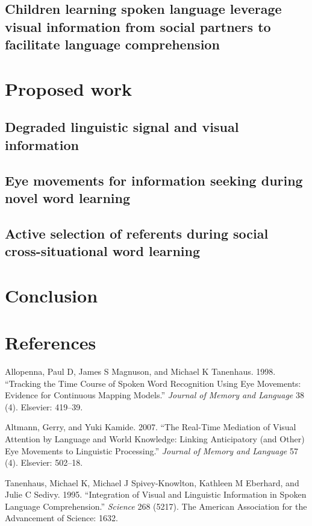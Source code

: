 \documentclass[]{elsarticle} %
\begin{document}
\subsection{Children learning spoken language leverage visual
information from social partners to facilitate language
comprehension}\label{children-learning-spoken-language-leverage-visual-information-from-social-partners-to-facilitate-language-comprehension}

\section{Proposed work}\label{proposed-work}

\subsection{Degraded linguistic signal and visual
information}\label{degraded-linguistic-signal-and-visual-information}

\subsection{Eye movements for information seeking during novel word
learning}\label{eye-movements-for-information-seeking-during-novel-word-learning}

\subsection{Active selection of referents during social
cross-situational word
learning}\label{active-selection-of-referents-during-social-cross-situational-word-learning}

\section{Conclusion}\label{conclusion}

\newpage 

\section{References}\label{references}

\setlength{\parindent}{-0.3in} \setlength{\leftskip}{0.2in} \noindent

\hypertarget{refs}{}
\hypertarget{ref-allopenna1998tracking}{}
Allopenna, Paul D, James S Magnuson, and Michael K Tanenhaus. 1998.
``Tracking the Time Course of Spoken Word Recognition Using Eye
Movements: Evidence for Continuous Mapping Models.'' \emph{Journal of
Memory and Language} 38 (4). Elsevier: 419--39.

\hypertarget{ref-altmann2007real}{}
Altmann, Gerry, and Yuki Kamide. 2007. ``The Real-Time Mediation of
Visual Attention by Language and World Knowledge: Linking Anticipatory
(and Other) Eye Movements to Linguistic Processing.'' \emph{Journal of
Memory and Language} 57 (4). Elsevier: 502--18.

\hypertarget{ref-tanenhaus1995integration}{}
Tanenhaus, Michael K, Michael J Spivey-Knowlton, Kathleen M Eberhard,
and Julie C Sedivy. 1995. ``Integration of Visual and Linguistic
Information in Spoken Language Comprehension.'' \emph{Science} 268
(5217). The American Association for the Advancement of Science: 1632.
\end{document}
